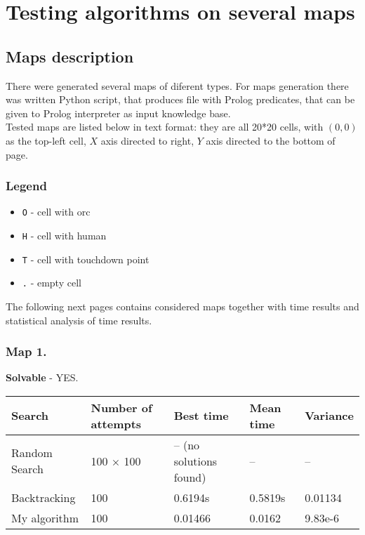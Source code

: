 \documentclass[a4paper,12pt]{article}
\begin{document}
    \section{Testing algorithms on several maps}
    \subsection{Maps description}
    There were generated several maps of diferent types. For maps generation 
    there was written Python script, that produces file with Prolog predicates, 
    that can be given to Prolog interpreter as input knowledge base.\\
    Tested maps are listed below in text format: they are all 20*20 cells, with
    $(0,0)$ as the top-left cell, $X$ axis directed to right, $Y$ axis directed
    to the bottom of page.
    \subsubsection*{Legend}
    \begin{itemize}
        \item \texttt{O} - cell with orc
        \item \texttt{H} - cell with human
        \item \texttt{T} - cell with touchdown point
        \item \texttt{.} - empty cell
    \end{itemize}
    The following next pages contains considered maps together with time results
    and statistical analysis of time results.
    \newpage
    \subsubsection*{Map 1.}
    
    \textbf{Solvable} - YES.\\
    \begin{center}
        \begin{tabular}{|l|l|l|l|l|}
            \hline
            Search & Number of attempts & Best time & Mean time & Variance\\
            \hline
            Random Search & 100 $\times$ 100 & -- (no solutions found) & -- & --\\
            \hline
            Backtracking & 100 & 0.6194s & 0.5819s & 0.01134\\
            \hline
            My algorithm & 100 & 0.01466 & 0.0162 &  9.83e-6\\
            \hline
        \end{tabular}
    \end{center}
    \newpage
\end{document}

